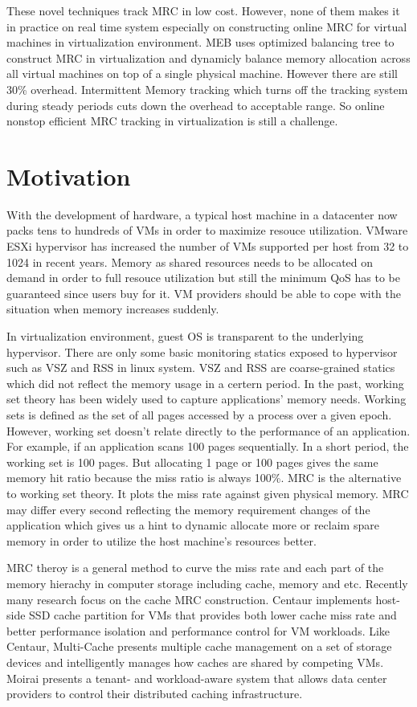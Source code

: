 \documentclass[10pt,twocolumn]{article}
\begin{document}
	These novel techniques track MRC in low cost. However, none of them makes it in practice on real time system especially on constructing online MRC for virtual machines in virtualization environment. MEB\cite{Wang2016Dynamic} uses optimized balancing tree to construct MRC in virtualization and dynamicly balance memory allocation across all virtual machines on top of a single physical machine. However there are still 30\% overhead. Intermittent Memory tracking which turns off the tracking system during steady periods cuts down the overhead to acceptable range. So online nonstop efficient MRC tracking in virtualization is still a challenge.
	
	\section{Motivation}
	With the development of hardware, a typical host machine in a datacenter now packs tens to hundreds of VMs in order to maximize resouce utilization. VMware ESXi hypervisor has increased the number of VMs supported per host from 32 to 1024 in recent years\cite{vmware}. Memory as shared resources needs to be allocated on demand in order to full resouce utilization but still the minimum QoS has to be guaranteed since users buy for it. VM providers should be able to cope with the situation when memory increases suddenly.
	
	In virtualization environment, guest OS is transparent to the underlying hypervisor. There are only some basic monitoring statics exposed to hypervisor such as VSZ and RSS in linux system. VSZ and RSS are coarse-grained statics which did not reflect the memory usage in a certern period. In the past, working set theory\cite{wss} has been widely used to capture applications' memory needs. Working sets is defined as the set of all pages accessed by a process over a given epoch. However, working set doesn't relate directly to the performance of an application. For example, if an application scans 100 pages sequentially. In a short period, the working set is 100 pages. But allocating 1 page or 100 pages gives the same memory hit ratio because the miss ratio is always 100\%. MRC is the alternative to working set theory. It plots the miss rate against given physical memory. MRC may differ every second reflecting the memory requirement changes of the application which gives us a hint to dynamic allocate more or reclaim spare memory in order to utilize the host machine's resources better.
	
	MRC theroy is a general method to curve the miss rate and each part of the memory hierachy in computer storage including cache, memory and etc. Recently many research focus on the cache MRC construction. Centaur\cite{Koller2015Centaur} implements host-side SSD cache partition for VMs that provides both lower cache miss rate and better performance isolation and performance control for VM workloads. Like Centaur, Multi-Cache\cite{Rajasekaran2016Multi} presents multiple cache management on a set of storage devices and intelligently manages how caches are shared by competing VMs. Moirai\cite{Stefanovici2015Software} presents a tenant- and workload-aware system that allows data center providers to control their distributed caching infrastructure. 
	
\end{document}
